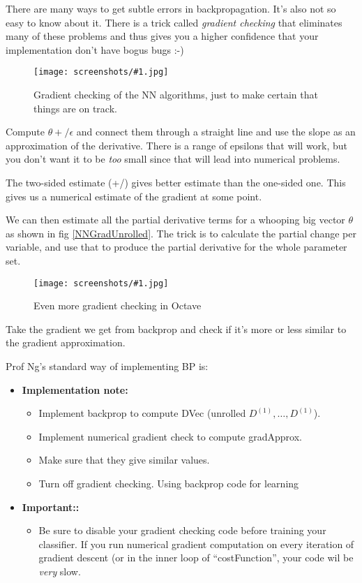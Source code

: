 \documentclass[a4, 12pt, english, USenglish]{scrreprt}
\newcommand{\screenshot}[2]{
\begin{figure}[htb]
\texttt{[image: screenshots/\#1.jpg]}
\label{#1}
\caption{#2}
\end{figure}}
\newcommand{\idx}[1]{{\em #1}\index{#1}}
\begin{document}
There are many ways to get subtle errors in backpropagation.   It's
also not so easy to know about it.  There is a trick called
\idx{gradient checking} that eliminates many of these problems and
thus gives you a higher confidence that your implementation don't have
bogus bugs :-)


\screenshot{NNgradientChecking}{Gradient checking of the NN
  algorithms, just to make certain that things are on track.}

Compute \(\theta +/ \epsilon\) and connect them through a straight
line and use the slope as an approximation of the derivative. There is
a range of epsilons that will work, but you don't want it to be {\em
  too} small since that will lead into numerical problems.

The two-sided estimate (+/) gives better estimate than the one-sided
one.  This gives us a numerical estimate of the gradient at some
point.

We can then estimate all the partial derivative terms for a whooping
big vector \(\theta\) as shown in fig \ref{NNGradUnrolled}.  The trick
is to calculate the partial change per variable, and use that to
produce the partial derivative for the whole parameter set.

\screenshot{NNOctaveGradientCheck}{Even more gradient checking in Octave}

Take the gradient we get from backprop and check if it's more or less
similar to the gradient approximation.

Prof Ng's standard way of implementing BP is:

\begin{itemize}
 \item {\bf Implementation note:}
\begin{itemize}
\item Implement backprop to compute DVec (unrolled \(D^{(1)}, \ldots,  D^{(1)} \)).
\item Implement numerical gradient check to compute gradApprox.
\item Make sure that they give similar values.
\item Turn off gradient checking.  Using backprop code for learning
\end{itemize}

 \item {\bf Important::}
\begin{itemize}

\item Be sure to disable your gradient checking code before training
  your classifier.  If you run numerical gradient computation on
  every iteration of gradient descent (or in the inner loop of
  ``costFunction'', your code wil be {\em very} slow.

\end{itemize}


\end{itemize}
\end{document}
